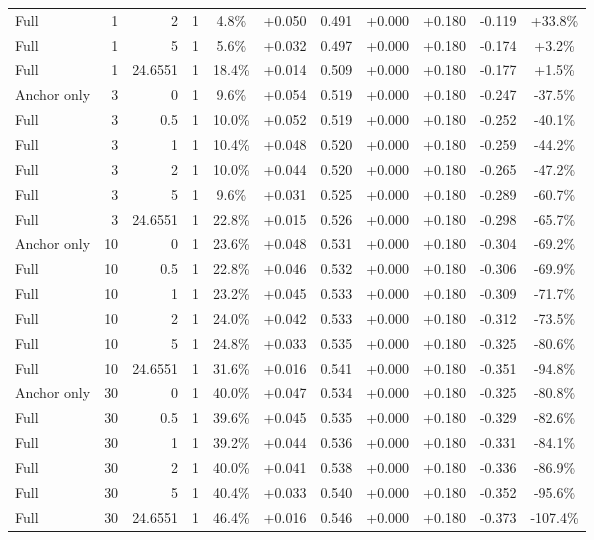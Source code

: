 \begin{table}[htbp]
\begin{tabular}{lrrrccccccc}
Full & 1 & 2 & 1 & 4.8\% & +0.050 & 0.491 & +0.000 & +0.180 & -0.119 & +33.8\% \\
Full & 1 & 5 & 1 & 5.6\% & +0.032 & 0.497 & +0.000 & +0.180 & -0.174 & +3.2\% \\
Full & 1 & 24.6551 & 1 & 18.4\% & +0.014 & 0.509 & +0.000 & +0.180 & -0.177 & +1.5\% \\
Anchor only & 3 & 0 & 1 & 9.6\% & +0.054 & 0.519 & +0.000 & +0.180 & -0.247 & -37.5\% \\
Full & 3 & 0.5 & 1 & 10.0\% & +0.052 & 0.519 & +0.000 & +0.180 & -0.252 & -40.1\% \\
Full & 3 & 1 & 1 & 10.4\% & +0.048 & 0.520 & +0.000 & +0.180 & -0.259 & -44.2\% \\
Full & 3 & 2 & 1 & 10.0\% & +0.044 & 0.520 & +0.000 & +0.180 & -0.265 & -47.2\% \\
Full & 3 & 5 & 1 & 9.6\% & +0.031 & 0.525 & +0.000 & +0.180 & -0.289 & -60.7\% \\
Full & 3 & 24.6551 & 1 & 22.8\% & +0.015 & 0.526 & +0.000 & +0.180 & -0.298 & -65.7\% \\
Anchor only & 10 & 0 & 1 & 23.6\% & +0.048 & 0.531 & +0.000 & +0.180 & -0.304 & -69.2\% \\
Full & 10 & 0.5 & 1 & 22.8\% & +0.046 & 0.532 & +0.000 & +0.180 & -0.306 & -69.9\% \\
Full & 10 & 1 & 1 & 23.2\% & +0.045 & 0.533 & +0.000 & +0.180 & -0.309 & -71.7\% \\
Full & 10 & 2 & 1 & 24.0\% & +0.042 & 0.533 & +0.000 & +0.180 & -0.312 & -73.5\% \\
Full & 10 & 5 & 1 & 24.8\% & +0.033 & 0.535 & +0.000 & +0.180 & -0.325 & -80.6\% \\
Full & 10 & 24.6551 & 1 & 31.6\% & +0.016 & 0.541 & +0.000 & +0.180 & -0.351 & -94.8\% \\
Anchor only & 30 & 0 & 1 & 40.0\% & +0.047 & 0.534 & +0.000 & +0.180 & -0.325 & -80.8\% \\
Full & 30 & 0.5 & 1 & 39.6\% & +0.045 & 0.535 & +0.000 & +0.180 & -0.329 & -82.6\% \\
Full & 30 & 1 & 1 & 39.2\% & +0.044 & 0.536 & +0.000 & +0.180 & -0.331 & -84.1\% \\
Full & 30 & 2 & 1 & 40.0\% & +0.041 & 0.538 & +0.000 & +0.180 & -0.336 & -86.9\% \\
Full & 30 & 5 & 1 & 40.4\% & +0.033 & 0.540 & +0.000 & +0.180 & -0.352 & -95.6\% \\
Full & 30 & 24.6551 & 1 & 46.4\% & +0.016 & 0.546 & +0.000 & +0.180 & -0.373 & -107.4\% \\

\end{tabular}
\end{table}

